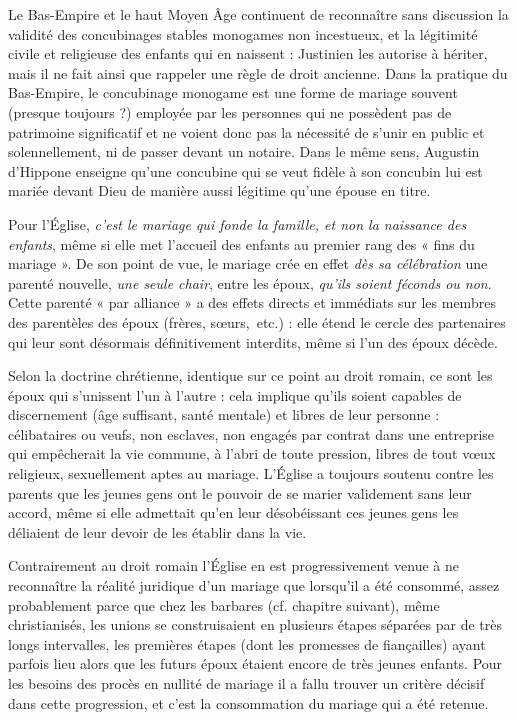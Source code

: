  Le Bas-Empire et le haut Moyen Âge continuent de reconnaître sans discussion la validité des concubinages stables monogames non incestueux, et la légitimité civile et religieuse des enfants qui en naissent : Justinien les autorise à hériter, mais il ne fait ainsi que rappeler une règle de droit ancienne. Dans la pratique du Bas-Empire, le concubinage monogame est une forme de mariage souvent (presque toujours ?) employée par les personnes qui ne possèdent pas de patrimoine significatif et ne voient donc pas la nécessité de s'unir en public et solennellement, ni de passer devant un notaire. Dans le même sens, Augustin d'Hippone enseigne qu'une concubine qui se veut fidèle à son concubin lui est mariée devant Dieu de manière aussi légitime qu'une épouse en titre.

 Pour l'Église, \emph{c'est le mariage qui fonde la famille, et non la naissance des enfants}, même si elle met l'accueil des enfants au premier rang des « fins du mariage ». De son point de vue, le mariage crée en effet \emph{dès sa célébration} une parenté nouvelle, \emph{une seule chair}, entre les époux, \emph{qu'ils soient féconds ou non}. Cette parenté « par alliance » a des effets directs et immédiats sur les membres des parentèles des époux (frères, sœurs,~etc.) : elle étend le cercle des partenaires qui leur sont désormais définitivement interdits, même si l'un des époux décède.

 Selon la doctrine chrétienne, identique sur ce point au droit romain, ce sont les époux qui s'unissent l'un à l'autre : cela implique qu'ils soient capables de discernement (âge suffisant, santé mentale) et libres de leur personne : célibataires ou veufs, non esclaves, non engagés par contrat dans une entreprise qui empêcherait la vie commune, à l'abri de toute pression, libres de tout vœux religieux, sexuellement aptes au mariage. L'Église a toujours soutenu contre les parents que les jeunes gens ont le pouvoir de se marier validement sans leur accord, même si elle admettait qu'en leur désobéissant ces jeunes gens les déliaient de leur devoir de les établir dans la vie. 

 Contrairement au droit romain l'Église en est progressivement venue à ne reconnaître la réalité juridique d'un mariage que lorsqu'il a été consommé, assez probablement parce que chez les barbares (cf. chapitre suivant), même christianisés, les unions se construisaient en plusieurs étapes séparées par de très longs intervalles, les premières étapes (dont les promesses de fiançailles) ayant parfois lieu alors que les futurs époux étaient encore de très jeunes enfants. Pour les besoins des procès en nullité de mariage il a fallu trouver un critère décisif dans cette progression, et c'est la consommation du mariage qui a été retenue. 

